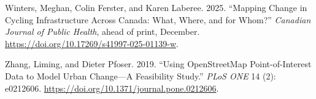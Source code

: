 \documentclass[
]{article}
\newlength{\cslhangindent}
\newenvironment{CSLReferences}[2] %
 {\begin{list}{}{%
  \setlength{\itemindent}{0pt}
  \setlength{\leftmargin}{0pt}
  \setlength{\parsep}{0pt}
  \ifodd #1
   \setlength{\leftmargin}{\cslhangindent}
   \setlength{\itemindent}{-1\cslhangindent}
  \fi
  \setlength{\itemsep}{#2\baselineskip}}}
 {\end{list}}
\begin{document}
\begin{CSLReferences}{1}{1}
Winters, Meghan, Colin Ferster, and Karen Laberee. 2025. {``Mapping
Change in Cycling Infrastructure Across {Canada}: {What}, Where, and for
Whom?''} \emph{Canadian Journal of Public Health}, ahead of print,
December. \url{https://doi.org/10.17269/s41997-025-01139-w}.

Zhang, Liming, and Dieter Pfoser. 2019. {``Using {OpenStreetMap}
Point-of-Interest Data to Model Urban Change---{A} Feasibility Study.''}
\emph{PLoS ONE} 14 (2): e0212606.
\url{https://doi.org/10.1371/journal.pone.0212606}.

\end{CSLReferences}
\end{document}

